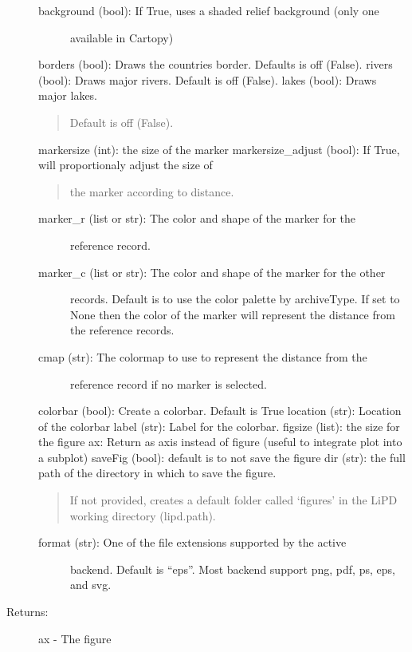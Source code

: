 \documentclass[letterpaper,10pt,english]{sphinxmanual}
\begin{document}
\begin{fulllineitems}
\begin{description}
\begin{description}
\item[{background (bool): If True, uses a shaded relief background (only one }] \leavevmode
available in Cartopy)

\end{description}

borders (bool): Draws the countries border. Defaults is off (False). 
rivers (bool): Draws major rivers. Default is off (False).
lakes (bool): Draws major lakes.
\begin{quote}

Default is off (False).
\end{quote}

markersize (int): the size of the marker
markersize\_adjust (bool): If True, will proportionaly adjust the size of
\begin{quote}

the marker according to distance.
\end{quote}
\begin{description}
\item[{marker\_r (list or str): The color and shape of the marker for the}] \leavevmode
reference record.

\item[{marker\_c (list or str): The color and shape of the marker for the other}] \leavevmode
records. Default is to use the color palette by archiveType. If set
to None then the color of the marker will represent the distance from
the reference records.

\item[{cmap (str): The colormap to use to represent the distance from the}] \leavevmode
reference record if no marker is selected.

\end{description}

colorbar (bool): Create a colorbar. Default is True
location (str): Location of the colorbar
label (str): Label for the colorbar.
figsize (list): the size for the figure
ax: Return as axis instead of figure (useful to integrate plot into a subplot)
saveFig (bool): default is to not save the figure
dir (str): the full path of the directory in which to save the figure.
\begin{quote}

If not provided, creates a default folder called ‘figures’ in the
LiPD working directory (lipd.path).
\end{quote}
\begin{description}
\item[{format (str): One of the file extensions supported by the active}] \leavevmode
backend. Default is “eps”. Most backend support png, pdf, ps, eps,
and svg.

\end{description}

\item[{Returns:}] \leavevmode
ax - The figure

\end{description}

\end{fulllineitems}
\end{document}
